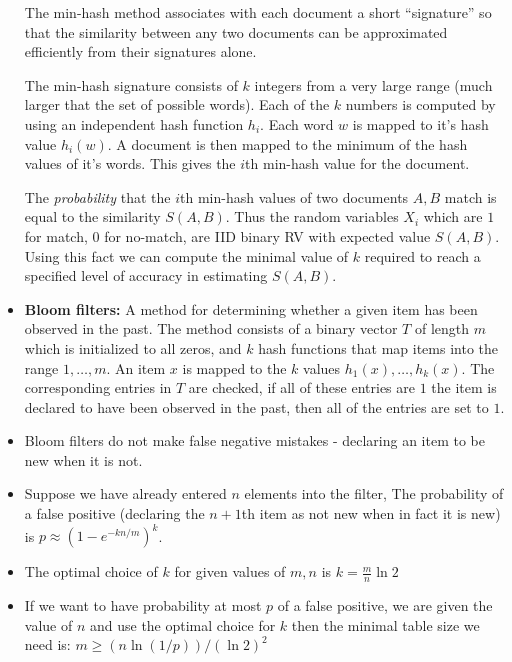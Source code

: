 \documentclass[10pt,twocolumn]{article}
\begin{document}
\begin{itemize}
The min-hash method associates with each document a short
``signature'' so that the similarity between any two documents can be
approximated efficiently from their signatures alone. 

The min-hash signature consists of $k$ integers from a very large
range (much larger that the set of possible words). Each of the $k$
numbers is computed by using an independent hash function $h_i$. Each
word $w$ is mapped to it's hash value $h_i(w)$. A document is then
mapped to the minimum of the hash values of it's words. This gives the
$i$th min-hash value for the document.

The {\em probability} that the $i$th min-hash values of two documents
$A,B$ match is equal to the similarity $S(A,B)$. Thus the random
variables $X_i$ which are $1$ for match, $0$ for no-match, are IID
binary RV with expected value $S(A,B)$. Using this fact we can compute
the minimal value of $k$ required to reach a specified level of
accuracy in estimating $S(A,B)$.
\item {\bf Bloom filters: } A method for determining whether a given
  item has been observed in the past. The method consists of a binary
  vector $T$ of length $m$ which is initialized to all zeros, and $k$
  hash functions that map items into the range $1,\ldots,m$. An item
  $x$ is mapped to the $k$ values $h_1(x),\ldots,h_k(x)$. The
  corresponding entries in $T$ are checked, if all of these entries
  are $1$ the item is declared to have been observed in the past, then
  all of the entries are set to $1$.
\item Bloom filters do not make false negative mistakes - declaring an
  item to be new when it is not.
\item Suppose we have already entered $n$ elements into the filter,
  The probability of a false positive (declaring the $n+1$th item as
  not new when in fact it is new) is $ p \approx \left(
    1-e^{-kn/m}\right)^k $.
\item The optimal choice of $k$ for given values of $m,n$ is
  $k=\frac{m}{n}\ln 2$
\item If we want to have probability at most $p$ of a false positive,
  we are given the value of $n$ and use the optimal choice for $k$
  then the minimal table size we need is: $m \geq (n\ln (1/p))/(\ln
  2)^2$
\end{itemize}
\end{document}
